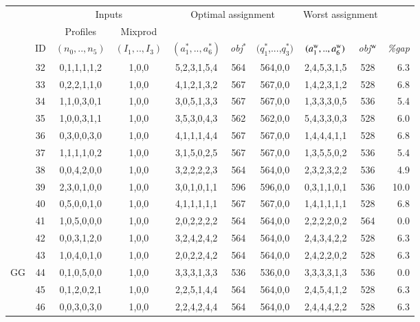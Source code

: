 \documentclass[review,12pt, 3p, times]{elsarticle}
\begin{document}
\begin{longtable}{|c|c|c|c|c|c|c|c|c|r|}
	\hline
	& & \multicolumn{2}{c|}{Inputs} & \multicolumn{3}{c|}{Optimal assignment} & \multicolumn{2}{c|}{Worst assignment }& \\
	& \multicolumn{1}{c|}{ } & \multicolumn{1}{c|}{Profiles} & \multicolumn{1}{c|}{Mixprod}& \multicolumn{1}{c}{}  & \multicolumn{2}{c|}{} & \multicolumn{2}{c|}{}&\multicolumn{1}{c|}{}\\
	& ID & \multicolumn{1}{c|}{$(n_0,..,n_5)$} & \multicolumn{1}{c|}{$(I_1,..,I_3)$} & {$(a^*_1,..,a^*_6)$} & \it{obj}$^*$ & $(q^*_1$,...,$q^*_3)$ & {$(a^{\textsc{w}}_1,..,a^{\textsc{w}}_6)$} & \it{obj}$^{\textsc{w}}$ & \it{\%gap}     \\ %
	\hline
	& 32 & 0,1,1,1,1,2 & 1,0,0 &5,2,3,1,5,4 & 564 & 564,0,0 & 2,4,5,3,1,5 & 528 & 6.3\\
	& 33 & 0,2,2,1,1,0 & 1,0,0 &4,1,2,1,3,2 & 567 & 567,0,0 & 1,4,2,3,1,2 & 528 & 6.8\\
	& 34 & 1,1,0,3,0,1 & 1,0,0 &3,0,5,1,3,3 & 567 & 567,0,0 & 1,3,3,3,0,5 & 536 & 5.4\\
	  & 35 & 1,0,0,3,1,1 & 1,0,0 & 3,5,3,0,4,3 & 562 & 562,0,0 & 5,4,3,3,0,3 & 528 & 6.0 \\ & 
	36 & 0,3,0,0,3,0 & 1,0,0 &4,1,1,1,4,4 & 567 & 567,0,0 & 1,4,4,4,1,1 & 528 & 6.8\\
	& 37 & 1,1,1,1,0,2 & 1,0,0 &3,1,5,0,2,5 & 567 & 567,0,0 & 1,3,5,5,0,2 & 536 & 5.4\\
	& 38 & 0,0,4,2,0,0 & 1,0,0 &3,2,2,2,2,3 & 564 & 564,0,0 & 2,3,2,3,2,2 & 536 & 4.9\\
	& 39 & 2,3,0,1,0,0 & 1,0,0 &3,0,1,0,1,1 & 596 & 596,0,0 & 0,3,1,1,0,1 & 536 & 10.0\\
	& 40 & 0,5,0,0,1,0 & 1,0,0 &4,1,1,1,1,1 & 567 & 567,0,0 & 1,4,1,1,1,1 & 528 & 6.8\\
	& 41 & 1,0,5,0,0,0 & 1,0,0 &2,0,2,2,2,2 & 564 & 564,0,0 & 2,2,2,2,0,2 & 564 & 0.0\\
	& 42 & 0,0,3,1,2,0 & 1,0,0 &3,2,4,2,4,2 & 564 & 564,0,0 & 2,4,3,4,2,2 & 528 & 6.3\\
	& 43 & 1,0,4,0,1,0 & 1,0,0 &2,0,2,2,4,2 & 564 & 564,0,0 & 2,4,2,2,0,2 & 528 & 6.3\\
	{GG}\label{SEN:GG} & 44 & 0,1,0,5,0,0 & 1,0,0 &3,3,3,1,3,3 & 536 & 536,0,0 & 3,3,3,3,1,3 & 536 & 0.0\\
	& 45 & 0,1,2,0,2,1 & 1,0,0 &2,2,5,1,4,4 & 564 & 564,0,0 & 2,4,5,4,1,2 & 528 & 6.3\\
	& 46 & 0,0,3,0,3,0 & 1,0,0 &2,2,4,2,4,4 & 564 & 564,0,0 & 2,4,4,4,2,2 & 528 & 6.3\\

\end{longtable}
\end{document}

